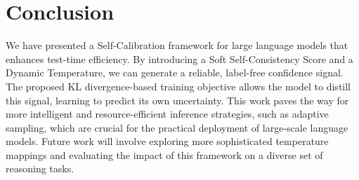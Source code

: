 \documentclass{article}
\begin{document}
\section{Conclusion}
We have presented a Self-Calibration framework for large language models that enhances test-time efficiency. By introducing a Soft Self-Consistency Score and a Dynamic Temperature, we can generate a reliable, label-free confidence signal. The proposed KL divergence-based training objective allows the model to distill this signal, learning to predict its own uncertainty. This work paves the way for more intelligent and resource-efficient inference strategies, such as adaptive sampling, which are crucial for the practical deployment of large-scale language models. Future work will involve exploring more sophisticated temperature mappings and evaluating the impact of this framework on a diverse set of reasoning tasks.




\end{document}
